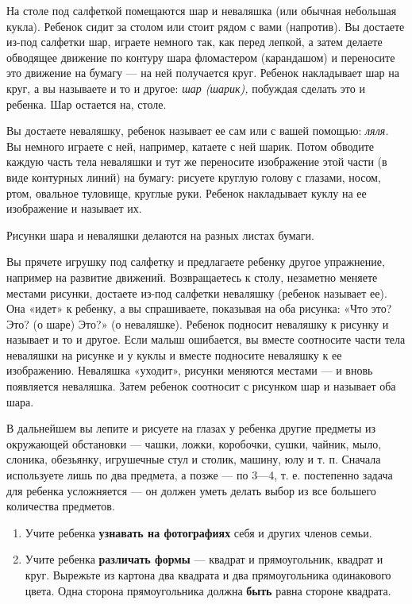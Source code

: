 \documentclass{book}
\renewcommand{\emph}[1]{\textit{#1}}
\begin{document}
На столе под салфеткой помещаются шар и неваляшка (или обычная небольшая
кукла). Ребенок сидит за столом или стоит рядом с вами (напротив). Вы
достаете из-под салфетки шар, играете немного так, как перед лепкой, а
затем делаете обводящее движение по контуру шара фломастером
(карандашом) и переносите это движение на бумагу --- на ней получается
круг. Ребенок накладывает шар на круг, а вы называете и то и другое:
\emph{шар (шарик),} побуждая сделать это и ребенка. Шар остается на,
столе.

Вы достаете неваляшку, ребенок называет ее сам или с вашей помощью:
\emph{ляля.} Вы немного играете с ней, например, катаете с ней шарик.
Потом обводите каждую часть тела неваляшки и тут же переносите
изображение этой части (в виде контурных линий) на бумагу: рисуете
круглую голову с глазами, носом, ртом, овальное туловище, круглые руки.
Ребенок накладывает куклу на ее изображение и называет их.

Рисунки шара и неваляшки делаются на разных листах бумаги.

Вы прячете игрушку под салфетку и предлагаете ребенку другое упражнение,
например на развитие движений. Возвращаетесь к столу, незаметно меняете
местами рисунки, достаете из-под салфетки неваляшку (ребенок называет
ее). Она «идет» к ребенку, а вы спрашиваете, показывая на оба рисунка:
«Что это? Это? (о шаре) Это?» (о неваляшке). Ребенок подносит неваляшку
к рисунку и называет и то и другое. Если малыш ошибается, вы вместе
соотносите части тела неваляшки на рисунке и у куклы и вместе подносите
неваляшку к ее изображению. Неваляшка «уходит», рисунки меняются местами
--- и вновь появляется неваляшка. Затем ребенок соотносит с рисунком шар
и называет оба шара.

В дальнейшем вы лепите и рисуете на глазах у ребенка другие предметы из
окружающей обстановки --- чашки, ложки, коробочки, сушки, чайник, мыло,
слоника, обезьянку, игрушечные стул и столик, машину, юлу и т. п.
Сначала используете лишь по два предмета, а позже --- по 3---4, т. е.
постепенно задача для ребенка усложняется --- он должен уметь делать
выбор из все большего количества предметов.


\begin{enumerate}
\def\labelenumi{\arabic{enumi}.}
\setcounter{enumi}{3}
\item
  
  Учите ребенка \textbf{узнавать на фотографиях} себя и других членов
  семьи.
  
\item
  
  Учите ребенка \textbf{различать формы} --- квадрат и прямоугольник,
  квадрат и круг. Вырежьте из картона два квадрата и два прямоугольника
  одинакового цвета. Одна сторона прямоугольника должна \textbf{быть}
  равна стороне квадрата.
  
\end{enumerate}
\end{document}
